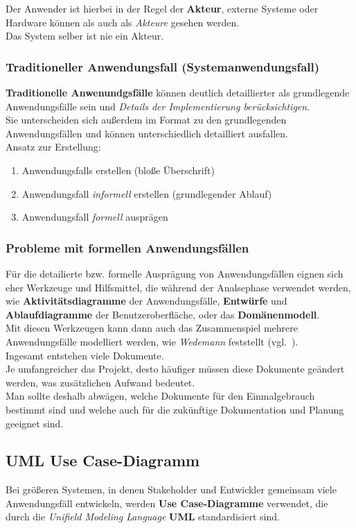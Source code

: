 \noindent
Der Anwender ist hierbei in der Regel der \textbf{Akteur}, externe Systeme oder Hardware können als auch als \textit{Akteure} gesehen werden.\\
Das System selber ist nie ein Akteur.

\subsubsection*{Traditioneller Anwendungsfall (Systemanwendungsfall)}
\textbf{Traditionelle Anwenundgsfälle} können deutlich detaillierter als grundlegende Anwendungsfälle sein und \textit{Details der Implementierung berücksichtigen}.\\
Sie unterscheiden sich außerdem im Format zu den grundlegenden Anwendungsfällen und können unterschiedlich detailliert ausfallen.\\

\noindent
Ansatz zur Erstellung:

\begin{enumerate}
    \item Anwendungsfalls  erstellen (bloße Überschrift)
    \item Anwendungsfall \textit{informell} erstellen (grundlegender Ablauf)
    \item Anwendungsfall \textit{formell} ausprägen
\end{enumerate}


\subsubsection*{Probleme mit formellen Anwendungsfällen}
Für die detailierte bzw. formelle Ausprägung von Anwendungsfällen eignen sich eher Werkzeuge und Hilfsmittel, die während der Analsephase verwendet werden, wie \textbf{Aktivitätsdiagramme} der Anwendungsfälle, \textbf{Entwürfe} und \textbf{Ablaufdiagramme} der Benutzeroberfläche, oder das \textbf{Domänenmodell}.\\
Mit diesen Werkzeugen kann dann auch das Zusammenspiel mehrere Anwendungsfälle modelliert werden, wie \textit{Wedemann} feststellt (vgl.~\cite[71]{Wed09}).\\

\noindent
Ingesamt entstehen viele Dokumente.\\
Je umfangreicher das Projekt, desto häufiger müssen diese Dokumente geändert werden, was zusätzlichen Aufwand bedeutet.\\
Man sollte deshalb abwägen, welche Dokumente für den Einmalgebrauch bestimmt sind und welche auch für die zukünftige Dokumentation und Planung geeignet sind.

\subsection{UML Use Case-Diagramm}
Bei größeren Systemen, in denen Stakeholder und Entwickler gemeinsam viele Anwendungsfäll entwickeln, werden \textbf{Use Case-Diagramme} verwendet, die durch die \textit{Unifield Modeling Language} \textbf{UML} standardisiert sind.\\